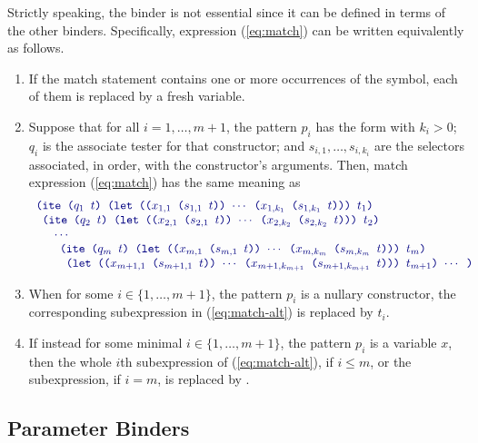 Strictly speaking, the  binder is not essential 
since it can be defined in terms of the other binders. 
Specifically, expression (\ref{eq:match})
can be written equivalently as follows.
\begin{enumerate}
  \item If the match statement contains one or more occurrences of
  the \expr{\_} symbol, each of them is replaced by a fresh variable.
\item
Suppose that for all $i=1,\ldots, m + 1$, the pattern $p_i$ has the form
 with $k_i>0$;
$q_i$ is the associate tester for that constructor; and
$s_{i,1}, \ldots, s_{i,k_i}$ are the selectors associated, in order,
with the constructor's arguments.
Then, match expression (\ref{eq:match}) has the same meaning as 
%
\begin{equation} \label{eq:match-alt}
\begin{array}{l}
\expr{(ite ($q_1$ $t$) 
 (let (($x_{1,1}$ ($s_{1,1}$ $t$)) $\cdots$ ($x_{1,k_1}$ ($s_{1,k_1}$ $t$))) $t_1$)}
\\
\expr{ (ite ($q_2$ $t$) 
 (let (($x_{2,1}$ ($s_{2,1}$ $t$)) $\cdots$ ($x_{2,k_2}$ ($s_{2,k_2}$ $t$))) $t_2$)}
\\
\quad \expr{ $\cdots$}
\\
\quad\quad\expr{(ite ($q_m$ $t$) 
 (let (($x_{m,1}$ ($s_{m,1}$ $t$)) $\cdots$ ($x_{m,k_m}$ ($s_{m,k_m}$ $t$))) $t_m$)}
\\
\quad\quad\expr{ (let (($x_{m+1,1}$ ($s_{m+1,1}$ $t$)) $\cdots$ ($x_{m+1,k_{m+1}}$ ($s_{m+1,k_{m+1}}$ $t$))) $t_{m+1}$) $\cdots$ ) }
\end{array}
\end{equation}

\item 
When for some $i \in \{1,\ldots, m + 1\}$, the pattern $p_i$ is a nullary constructor, 
the corresponding  subexpression in (\ref{eq:match-alt}) is replaced 
by $t_i$.

\item 
If instead for some minimal $i \in \{1,\ldots, m + 1\}$, the pattern $p_i$ is
a variable $x$, then the whole $i$th  subexpression of (\ref{eq:match-alt}),
if $i\leq m$, 
or the  subexpression, if $i=m$, is replaced by .
\end{enumerate}


\subsection{Parameter Binders}

